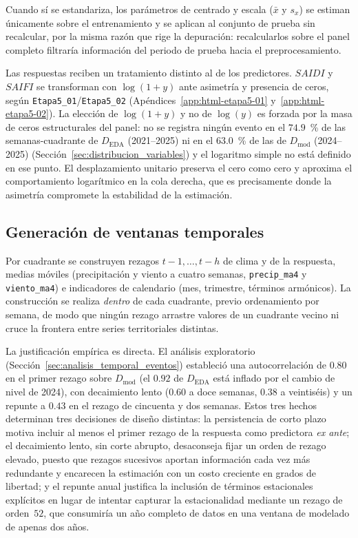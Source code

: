 Cuando sí se estandariza, los parámetros de centrado y escala ($\bar{x}$ y $s_x$) se estiman únicamente sobre el entrenamiento y se aplican al conjunto de prueba sin recalcular, por la misma razón que rige la depuración: recalcularlos sobre el panel completo filtraría información del periodo de prueba hacia el preprocesamiento.

Las respuestas reciben un tratamiento distinto al de los predictores. $SAIDI$ y $SAIFI$ se transforman con $\log(1+y)$ ante asimetría y presencia de ceros, según \texttt{Etapa5\_01}/\texttt{Etapa5\_02} (Apéndices~\ref{app:html-etapa5-01} y~\ref{app:html-etapa5-02}). La elección de $\log(1+y)$ y no de $\log(y)$ es forzada por la masa de ceros estructurales del panel: no se registra ningún evento en el $74{.}9$~\% de las semanas-cuadrante de $D_{\mathrm{EDA}}$ (2021--2025) ni en el $63{.}0$~\% de las de $D_{\mathrm{mod}}$ (2024--2025) (Sección~\ref{sec:distribucion_variables}) y el logaritmo simple no está definido en ese punto. El desplazamiento unitario preserva el cero como cero y aproxima el comportamiento logarítmico en la cola derecha, que es precisamente donde la asimetría compromete la estabilidad de la estimación.

\subsection{Generación de ventanas temporales}
\label{sec:ventanas_temporales}
Por cuadrante se construyen rezagos $t-1,\ldots,t-h$ de clima y de la respuesta, medias móviles (precipitación y viento a cuatro semanas, \texttt{precip\_ma4} y \texttt{viento\_ma4}) e indicadores de calendario (mes, trimestre, términos armónicos). La construcción se realiza \textit{dentro} de cada cuadrante, previo ordenamiento por semana, de modo que ningún rezago arrastre valores de un cuadrante vecino ni cruce la frontera entre series territoriales distintas.

La justificación empírica es directa. El análisis exploratorio (Sección~\ref{sec:analisis_temporal_eventos}) estableció una autocorrelación de $0{.}80$ en el primer rezago sobre $D_{\mathrm{mod}}$ (el $0{.}92$ de $D_{\mathrm{EDA}}$ está inflado por el cambio de nivel de 2024), con decaimiento lento ($0{.}60$ a doce semanas, $0{.}38$ a veintiséis) y un repunte a $0{.}43$ en el rezago de cincuenta y dos semanas. Estos tres hechos determinan tres decisiones de diseño distintas: la persistencia de corto plazo motiva incluir al menos el primer rezago de la respuesta como predictora \emph{ex ante}; el decaimiento lento, sin corte abrupto, desaconseja fijar un orden de rezago elevado, puesto que rezagos sucesivos aportan información cada vez más redundante y encarecen la estimación con un costo creciente en grados de libertad; y el repunte anual justifica la inclusión de términos estacionales explícitos en lugar de intentar capturar la estacionalidad mediante un rezago de orden~$52$, que consumiría un año completo de datos en una ventana de modelado de apenas dos años.

